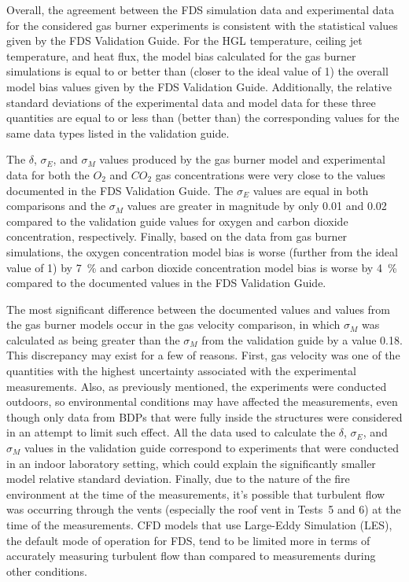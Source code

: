 Overall, the agreement between the FDS simulation data and experimental data for the considered gas burner experiments is consistent with the statistical values given by the FDS Validation Guide. For the HGL temperature, ceiling jet temperature, and heat flux, the model bias calculated for the gas burner simulations is equal to or better than (closer to the ideal value of 1) the overall model bias values given by the FDS Validation Guide. Additionally, the relative standard deviations of the experimental data and model data for these three quantities are equal to or less than (better than) the corresponding values for the same data types listed in the validation guide. 

The $\delta$, $\sigma_E$, and $\sigma_M$ values produced by the gas burner model and experimental data for both the $O_2$ and $CO_2$ gas concentrations were very close to the values documented in the FDS Validation Guide. The $\sigma_E$ values are equal in both comparisons and the $\sigma_M$ values are greater in magnitude by only 0.01 and 0.02 compared to the validation guide values for oxygen and carbon dioxide concentration, respectively. Finally, based on the data from gas burner simulations, the oxygen concentration model bias is worse (further from the ideal value of 1) by 7~\% and carbon dioxide concentration model bias is worse by 4~\% compared to the documented values in the FDS Validation Guide.

The most significant difference between the documented values and values from the gas burner models occur in the gas velocity comparison, in which $\sigma_M$ was calculated as being greater than the $\sigma_M$ from the validation guide by a value 0.18. This discrepancy may exist for a few of reasons. First, gas velocity was one of the quantities with the highest uncertainty associated with the experimental measurements. Also, as previously mentioned, the experiments were conducted outdoors, so environmental conditions may have affected the measurements, even though only data from BDPs that were fully inside the structures were considered in an attempt to limit such effect. All the data used to calculate the $\delta$, $\sigma_E$, and $\sigma_M$ values in the validation guide correspond to experiments that were  conducted in an indoor laboratory setting, which could explain the significantly smaller model relative standard deviation. Finally, due to the nature of the fire environment at the time of the measurements, it's possible that turbulent flow was occurring through the vents (especially the roof vent in Tests~5 and 6) at the time of the measurements. CFD models that use Large-Eddy Simulation (LES), the default mode of operation for FDS, tend to be limited more in terms of accurately measuring turbulent flow than compared to measurements during other conditions.
